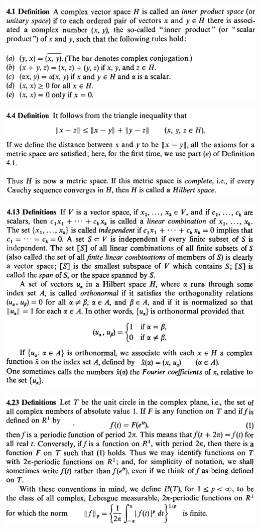 \documentclass[12pt]{article}
\begin{document}
		\begin{center}
		\includegraphics{d4ponto1}
		\end{center}

		\begin{center}
		\includegraphics{d4ponto4}
		\end{center}

		\begin{center}
		\includegraphics{d4ponto13}
		\end{center}

		\begin{center}
		\includegraphics{d4ponto23}
		\end{center}
\end{document}
